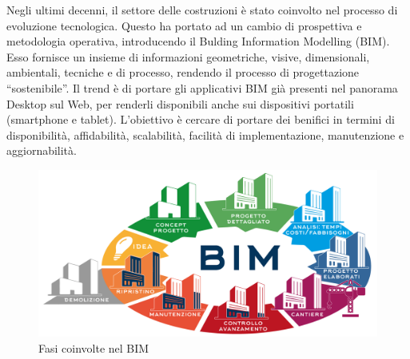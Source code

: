 Negli ultimi decenni, il settore delle costruzioni è stato coinvolto nel processo di evoluzione tecnologica.
Questo ha portato ad un cambio di prospettiva e metodologia operativa, introducendo il Bulding Information Modelling (BIM).
Esso fornisce un insieme di informazioni geometriche, visive, dimensionali, ambientali, tecniche e di processo, rendendo
il processo di progettazione ``sostenibile''.
Il trend è di portare gli applicativi BIM già presenti nel panorama Desktop sul Web, per renderli disponibili anche
sui dispositivi portatili (smartphone e tablet). L'obiettivo è cercare di portare dei benifici in termini di disponibilità, affidabilità,
scalabilità, facilità di implementazione, manutenzione e aggiornabilità.

\begin{figure}[htbp] %
   \centering
   \includegraphics[width=1\linewidth]{images/bim}
   \caption{Fasi coinvolte nel BIM}
   \label{fig:bim}
\end{figure}
\newpage

